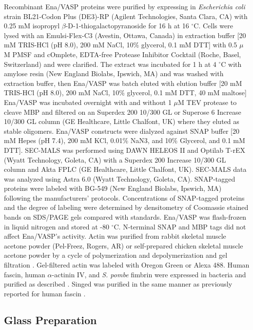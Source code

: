 Recombinant Ena/VASP proteins were purified by expressing in \textit{Escherichia coli} strain BL21-Codon Plus (DE3)-RP (Agilent Technologies, Santa Clara, CA) with 0.25 mM isopropyl $\beta$-D-1-thiogalactopyranoside for 16 h at 16 $^{\circ}$C. Cells were lysed with an Emulsi-Flex-C3 (Avestin, Ottawa, Canada) in extraction buffer [20 mM TRIS-HCl (pH 8.0), 200 mM NaCl, 10\% glycerol, 0.1 mM DTT] with 0.5 $\mu$M PMSF and cOmplete, EDTA-free Protease Inhibitor Cocktail (Roche, Basel, Switzerland) and were clarified. The extract was incubated for 1 h at 4 $^{\circ}$C with amylose resin (New England Biolabs, Ipswich, MA) and was washed with extraction buffer, then Ena/VASP was batch eluted with elution buffer [20 mM TRIS-HCl (pH 8.0), 200 mM NaCl, 10\% glycerol, 0.1 mM DTT, 40 mM maltose] Ena/VASP was incubated overnight with and without 1 $\mu$M TEV protease to cleave MBP and filtered on an Superdex 200 10/300 GL or Superose 6 Increase 10/300 GL column (GE Healthcare, Little Chalfont, UK) where they eluted as stable oligomers. Ena/VASP constructs were dialyzed against SNAP buffer [20 mM Hepes (pH 7.4), 200 mM KCl, 0.01\% NaN3, and 10\% Glycerol, and 0.1 mM DTT]. SEC-MALS was performed using DAWN HELEOS II and Optilab T-rEX (Wyatt Technology, Goleta, CA) with a Superdex 200 Increase 10/300 GL column and Akta FPLC (GE Healthcare, Little Chalfont, UK). SEC-MALS data was analyzed using Astra 6.0 (Wyatt Technology, Goleta, CA). SNAP-tagged proteins were labeled with BG-549 (New England Biolabs, Ipswich, MA) following the manufacturers' protocols. Concentrations of SNAP-tagged proteins and the degree of labeling were determined by densitometry of Coomassie stained bands on SDS/PAGE gels compared with standards. Ena/VASP was flash-frozen in liquid nitrogen and stored at -80 $^{\circ}$C. N-terminal SNAP and MBP tags did not affect Ena/VASP's activity. Actin was purified from rabbit skeletal muscle acetone powder (Pel-Freez, Rogers, AR) or self-prepared chicken skeletal muscle acetone powder by a cycle of polymerization and depolymerization and gel filtration \citep{spudich_regulation_1971}. Gel-filtered actin was labeled with Oregon Green \citep{kuhn_real-time_2005} or Alexa 488. Human fascin, human $\alpha$-actinin IV, and \textit{S. pombe} fimbrin were expressed in bacteria and purified as described \citep{vignjevic_formation_2003,skau_fimbrin_2010,li_f-actin_2016}. Singed was purified in the same manner as previously reported for human fascin \citep{vignjevic_formation_2003}. 

\subsection{Glass Preparation}\label{ena-mm-glass}

